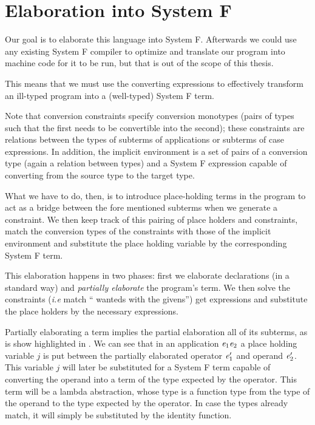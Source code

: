 \section{Elaboration into System F}
Our goal is to elaborate this language into System F. Afterwards we could use any existing System F compiler to optimize and translate our program into machine code for it to be run, but that is out of the scope of this thesis.

This means that we must use the converting expressions to effectively transform an ill-typed program into a (well-typed) System F term.

Note that conversion constraints specify conversion monotypes (pairs of types such that the first needs to be convertible into the second); these constraints are relations between the types of subterms of applications or subterms of case expressions. In addition, the implicit environment is a set of pairs of a conversion type (again a relation between types) and a System F expression capable of converting from the source type to the target type.

What we have to do, then, is to introduce place-holding terms in the program to act as a bridge between the fore mentioned subterms when we generate a constraint. We then keep track of this pairing of place holders and constraints, match the conversion types of the constraints with those of the implicit environment and substitute the place holding variable by the corresponding System F term.

This elaboration happens in two phases: first we elaborate declarations (in a standard way) and \textit{partially elaborate} the program's term. We then solve the constraints (\textit{i.e} match `` wanteds with the givens'') get expressions and substitute the place holders by the necessary expressions.

Partially elaborating a term implies the partial elaboration all of its subterms, as is show highlighted in . We can see that in an application $\mathit{e}_1 \mathit{e}_2$ a place holding variable $j$ is put between the partially elaborated operator $\mathit{e}_1'$ and operand $\mathit{e}_2'$. This variable $j$ will later be substituted for a System F term capable of converting the operand into a term of the type expected by the operator. This term will be a lambda abstraction, whose type is a function type from the type of the operand to the type expected by the operator. In case the types already match, it will simply be substituted by the identity function.

